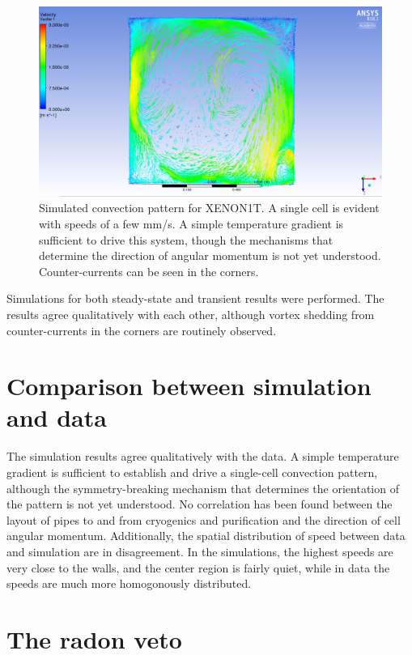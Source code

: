 \begin{figure}[htb]
\centering
    \includegraphics[width=\textwidth]{figures/rnveto/convection_sim}
    \caption{Simulated convection pattern for XENON1T. A single cell is evident with speeds of a few mm/s. A simple temperature gradient is sufficient to drive this system, though the mechanisms that determine the direction of angular momentum is not yet understood. Counter-currents can be seen in the corners.}\label{fig:cfd_sample}
\end{figure}

Simulations for both steady-state and transient results were performed. The results agree qualitatively with each other, although vortex shedding from counter-currents in the corners are routinely observed.

\section{Comparison between simulation and data}

The simulation results agree qualitatively with the data. A simple temperature gradient is sufficient to establish and drive a single-cell convection pattern, although the symmetry-breaking mechanism that determines the orientation of the pattern is not yet understood. No correlation has been found between the layout of pipes to and from cryogenics and purification and the direction of cell angular momentum. Additionally, the spatial distribution of speed between data and simulation are in disagreement. In the simulations, the highest speeds are very close to the walls, and the center region is fairly quiet, while in data the speeds are much more homogonously distributed.

\section{The radon veto}~\label{sec:rnveto}

